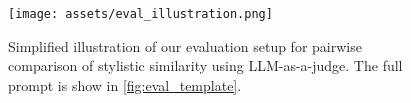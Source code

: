 
\begin{figure}[t]
    \centering
    \texttt{[image: assets/eval\_illustration.png]}













    
    \caption{Simplified illustration of our evaluation setup for pairwise comparison of stylistic similarity using LLM-as-a-judge. The full prompt is show in \autoref{fig:eval_template}.}
    \label{fig:simple_evaluation_prompt}
\end{figure}


